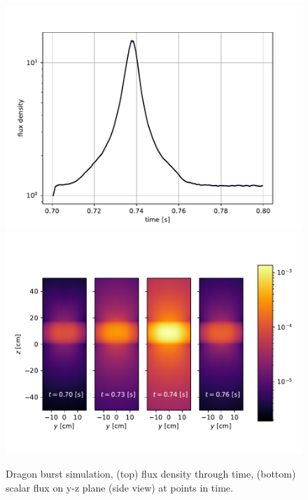 \begin{figure}
    \centering
    \includegraphics[width=.75\linewidth]{figures/delta_figs/dragon/dragon_curve.pdf}
    \vspace{1em}
    \includegraphics[width=.75\linewidth]{figures/delta_figs/dragon/flux_dragon.pdf}
    \caption{Dragon burst simulation, (top) flux density through time, (bottom) scalar flux on y-z plane (side view) at points in time.}
    \label{fig:dragon_results}
\end{figure}

